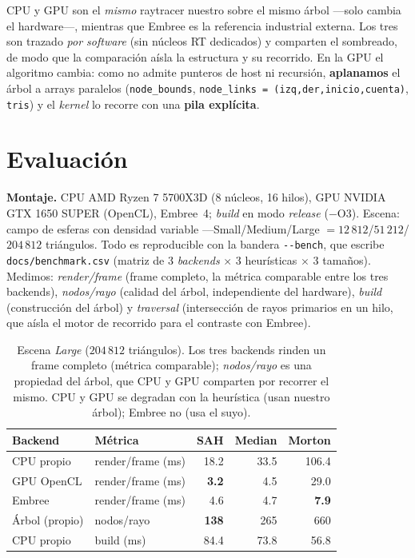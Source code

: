 \documentclass[10pt]{article}
\begin{document}
\noindent CPU y GPU son el \emph{mismo} raytracer nuestro sobre el mismo árbol
---solo cambia el hardware---, mientras que Embree es la referencia industrial
externa. Los tres son trazado \emph{por software} (sin núcleos RT dedicados) y
comparten el sombreado, de modo que la comparación aísla la estructura y su
recorrido. En la GPU el algoritmo cambia: como no admite punteros de host ni
recursión, \textbf{aplanamos} el árbol a arrays paralelos (\texttt{node\_bounds},
\texttt{node\_links = (izq,der,inicio,cuenta)}, \texttt{tris}) y el \emph{kernel}
lo recorre con una \textbf{pila explícita}.

\section{Evaluación}
\textbf{Montaje.} CPU AMD Ryzen 7 5700X3D (8 núcleos, 16 hilos), GPU NVIDIA GTX
1650 SUPER (OpenCL), Embree~4; \emph{build} en modo \emph{release} ($-$O3).
Escena: campo de esferas con densidad variable ---Small/Medium/Large
$=12\,812$/$51\,212$/$204\,812$ triángulos. Todo es reproducible con la bandera
\texttt{-{}-bench}, que escribe \texttt{docs/benchmark.csv} (matriz de 3
\emph{backends} $\times$ 3 heurísticas $\times$ 3 tamaños). Medimos:
\emph{render/frame} (frame completo, la métrica comparable entre los tres
backends), \emph{nodos/rayo} (calidad del árbol, independiente del hardware),
\emph{build} (construcción del árbol) y \emph{traversal} (intersección de rayos
primarios en un hilo, que aísla el motor de recorrido para el contraste con Embree).

\begin{table}[h]\centering\small
\caption{Escena \emph{Large} ($204\,812$ triángulos). Los tres backends rinden un
frame completo (métrica comparable); \emph{nodos/rayo} es una propiedad del árbol,
que CPU y GPU comparten por recorrer el mismo. CPU y GPU se degradan con la
heurística (usan nuestro árbol); Embree no (usa el suyo).}
\setlength{\tabcolsep}{6pt}
\begin{tabular}{llrrr}\toprule
Backend & Métrica & SAH & Median & Morton \\\midrule
CPU propio  & render/frame (ms) & 18.2 & 33.5 & 106.4 \\
GPU OpenCL  & render/frame (ms) & \textbf{3.2} & 4.5  & 29.0  \\
Embree      & render/frame (ms) & 4.6  & 4.7  & \textbf{7.9} \\
\midrule
Árbol (propio) & nodos/rayo     & \textbf{138}  & 265  & 660   \\
CPU propio     & build (ms)     & 84.4          & 73.8 & 56.8 \\
\bottomrule
\end{tabular}
\end{table}
\end{document}
